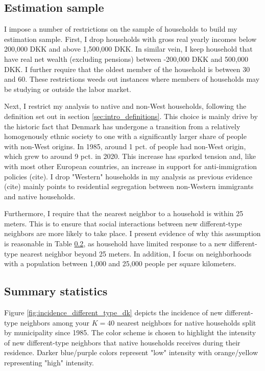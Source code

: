 \documentclass[main.tex]{subfiles}
\begin{document}
\subsection{Estimation sample}
\label{sec:estimation_sample_definition}
I impose a number of restrictions on the sample of households to build my estimation sample. First, I drop households with gross real yearly incomes below 200,000 DKK and above 1,500,000 DKK. In similar vein, I keep household that have real net wealth (excluding pensions) between -200,000 DKK and 500,000 DKK. I further require that the oldest member of the household is between 30 and 60. These restrictions weeds out instances where members of households may be studying or outside the labor market.  

Next, I restrict my analysis to native and non-West households, following the definition set out in section \ref{sec:intro_definitions}. This choice is mainly drive by the historic fact that Denmark has undergone a transition from a relatively homogenously ethnic society to one with a significantly larger share of people with non-West origins. In 1985, around 1 pct. of people had non-West origin, which grew to around 9 pct. in 2020. This increase has sparked tension and, like with most other European countries, an increase in support for anti-immigration policies (cite). I drop "Western" households in my analysis as previous evidence (cite) mainly points to residential segregation between non-Western immigrants and native households.

Furthermore, I require that the nearest neighbor to a household is within 25 meters. This is to ensure that social interactions between new different-type neighbors are more likely to take place. I present evidence of why this assumption is reasonable in Table \ref{}, as household have limited response to a new different-type nearest neighbor beyond 25 meters. In addition, I focus on neighborhoods with a population between 1,000 and 25,000 people per square kilometers. 

\subsection{Summary statistics}
Figure \ref{fig:incidence_different_type_dk} depicts the incidence of new different-type neighbors among your $K=40$ nearest neighbors for native households split by municipality since 1985. The color scheme is chosen to highlight the intensity of new different-type neighbors that native households receives during their residence. Darker blue/purple colors represent "low" intensity with orange/yellow representing "high" intensity.
\end{document}
